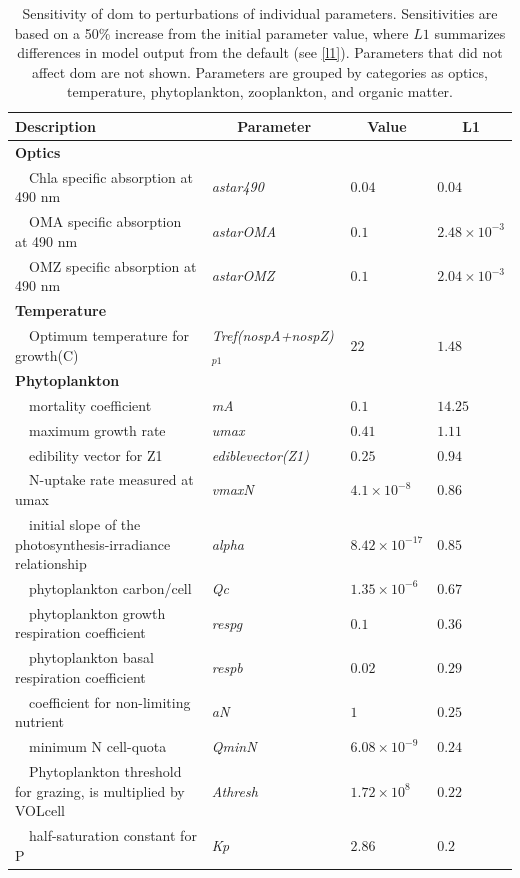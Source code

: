 \documentclass[review]{elsarticle}\usepackage[]{graphicx}\usepackage[]{color}
\begin{document}
\begin{table}[!tbp]
{\footnotesize
\caption{Sensitivity of \acl{dom} to perturbations of individual parameters.  Sensitivities are based on a 50\% increase from the initial parameter value, where $L1$ summarizes differences in model output from the default (see \cref{l1}).  Parameters that did not affect \acl{dom} are not shown.  Parameters are grouped by categories as optics, temperature, phytoplankton, zooplankton, and organic matter.\label{tab:om2sens}} 
\begin{center}
\begin{tabular}{llll}
\hline\hline
\multicolumn{1}{l}{Description}&\multicolumn{1}{c}{Parameter}&\multicolumn{1}{c}{Value}&\multicolumn{1}{c}{L1}\tabularnewline
\hline
{\bfseries Optics}&&&\tabularnewline
~~Chla specific absorption at 490 nm&\textit{astar490}&$0.04$&$0.04$\tabularnewline
~~OMA specific absorption at 490 nm&\textit{astarOMA}&$0.1$&$2.48\times 10^{-3}$\tabularnewline
~~OMZ specific absorption at 490 nm&\textit{astarOMZ}&$0.1$&$2.04\times 10^{-3}$\tabularnewline
\hline
{\bfseries Temperature}&&&\tabularnewline
~~Optimum temperature for growth(C)&\textit{Tref(nospA+nospZ)$_{p1}$}&$22$&$1.48$\tabularnewline
\hline
{\bfseries Phytoplankton}&&&\tabularnewline
~~mortality coefficient&\textit{mA}&$0.1$&$14.25$\tabularnewline
~~maximum growth rate&\textit{umax}&$0.41$&$1.11$\tabularnewline
~~edibility vector for Z1&\textit{ediblevector(Z1)}&$0.25$&$0.94$\tabularnewline
~~N-uptake rate measured at umax&\textit{vmaxN}&$4.1\times 10^{-8}$&$0.86$\tabularnewline
~~initial slope of the photosynthesis-irradiance relationship&\textit{alpha}&$8.42\times 10^{-17}$&$0.85$\tabularnewline
~~phytoplankton carbon/cell&\textit{Qc}&$1.35\times 10^{-6}$&$0.67$\tabularnewline
~~phytoplankton growth respiration coefficient&\textit{respg}&$0.1$&$0.36$\tabularnewline
~~phytoplankton basal respiration coefficient&\textit{respb}&$0.02$&$0.29$\tabularnewline
~~coefficient for non-limiting nutrient&\textit{aN}&$1$&$0.25$\tabularnewline
~~minimum N cell-quota&\textit{QminN}&$6.08\times 10^{-9}$&$0.24$\tabularnewline
~~Phytoplankton threshold for grazing, is multiplied by VOLcell&\textit{Athresh}&$1.72\times 10^{8}$&$0.22$\tabularnewline
~~half-saturation constant for P&\textit{Kp}&$2.86$&$0.2$\tabularnewline

\end{tabular}
\end{center}}
\end{table}
\end{document}

